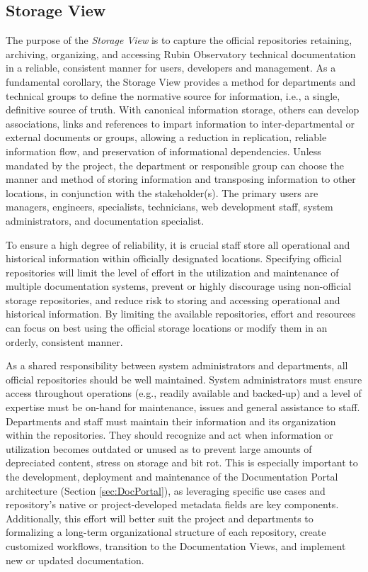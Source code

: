 \subsection{Storage View}
\label{sec:storage-view}

The purpose of the \emph{Storage View} is to capture the official repositories retaining, archiving, organizing, and accessing Rubin Observatory technical documentation in a reliable, consistent manner for users, developers and management.
As a fundamental corollary, the Storage View provides a method for departments and technical groups to define the normative source for information, i.e., a single, definitive source of truth.
With canonical information storage, others can develop associations, links and references to impart information to inter-departmental or external documents or groups, allowing a reduction in replication, reliable information flow, and preservation of informational dependencies.
Unless mandated by the project, the department or responsible group can choose the manner and method of storing information and transposing information to other locations, in conjunction with the stakeholder(s).
The primary users are managers, engineers, specialists, technicians, web development staff, system administrators, and documentation specialist.

To ensure a high degree of reliability, it is crucial staff store all operational and historical information within officially designated locations.
Specifying official repositories will limit the level of effort in the utilization and maintenance of multiple documentation systems, prevent or highly discourage using non-official storage repositories, and reduce risk to storing and accessing operational and historical information.
By limiting the available repositories, effort and resources can focus on best using the official storage locations or modify them in an orderly, consistent manner.

As a shared responsibility between system administrators and departments, all official repositories should be well maintained.
System administrators must ensure access throughout operations (e.g., readily available and backed-up) and a level of expertise must be on-hand for maintenance, issues and general assistance to staff.
Departments and staff must maintain their information and its organization within the repositories.
They should recognize and act when information or utilization becomes outdated or unused as to prevent large amounts of depreciated content, stress on storage and bit rot.
This is especially important to the development, deployment and maintenance of the Documentation Portal architecture (Section \ref{sec:DocPortal}), as leveraging specific use cases and repository's native or project-developed metadata fields are key components.
Additionally, this effort will better suit the project and departments to formalizing a long-term organizational structure of each repository, create customized workflows, transition to the Documentation Views, and implement new or updated documentation.


